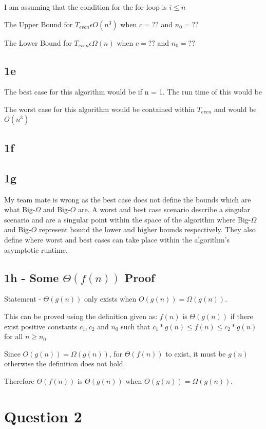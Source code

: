 \documentclass[oneside, a4paper]{article}
\begin{document}
I am assuming that the condition for the for loop is $i \leq n$ 

The Upper Bound for $T_{even} \epsilon O(n^3)$ when $c = ??$ and $n_0 = ??$ 

The Lower Bound for $T_{even} \epsilon \Omega(n)$ when $c = ??$ and $n_0 = ??$ 

\subsection*{1e}
The best case for this algorithm would be if n = 1. The run time of this would be 

The worst case for this algorithm would be contained within $T_{even}$ and would be $O(n^3)$

\subsection*{1f}
\subsection*{1g}
My team mate is wrong as the best case does not define the bounds which are what Big-$\Omega$ and Big-$O$ are. A worst and best case scenario describe a singular scenario and are a singular point within the space of the algorithm where Big-$\Omega$ and Big-$O$ represent bound the lower and higher bounds respectively. They also define where worst and best cases can take place within the algorithm's asymptotic runtime.
\subsection*{1h - Some $\Theta(f(n))$ Proof}
Statement - $\Theta(g(n))$ only exists when $O(g(n)) = \Omega(g(n))$. 

This can be proved using the definition given as:
$f(n)$ is $\Theta(g(n))$ if there exist positive constants $c_1, c_2$ and $n_0$ such that $c_1 * g(n) \leq f(n) \leq c_2 * g(n)$ for all $n \geq n_0$

Since $O(g(n)) = \Omega(g(n))$, for $\Theta(f(n))$ to exist, it must be $g(n)$ otherwise the definition does not hold. 

Therefore $\Theta(f(n))$ is $\Theta(g(n))$ when $O(g(n)) = \Omega(g(n))$.

\newpage
\section*{Question 2}
\end{document}
